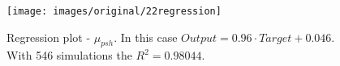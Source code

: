 \begin{figure}[!h] 
\centering 
\texttt{[image: images/original/22regression]}
\caption[Regression plot]{Regression plot - $\mu_{psh}$. In this case $Output
= 0.96 \cdot Target + 0.046$. With 546 simulations the $R^2 = 0.98044$.}
\label{fig:22regression} 
\end{figure}


